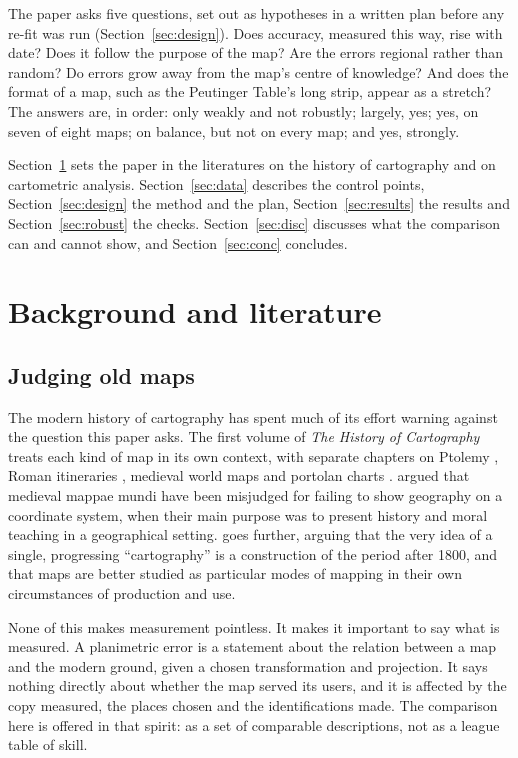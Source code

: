 \documentclass[11pt,a4paper]{article}
\begin{document}
The paper asks five questions, set out as hypotheses in a written plan before any re-fit was run (Section~\ref{sec:design}). Does accuracy, measured this way, rise with date? Does it follow the purpose of the map? Are the errors regional rather than random? Do errors grow away from the map's centre of knowledge? And does the format of a map, such as the Peutinger Table's long strip, appear as a stretch? The answers are, in order: only weakly and not robustly; largely, yes; yes, on seven of eight maps; on balance, but not on every map; and yes, strongly.

Section~\ref{sec:lit} sets the paper in the literatures on the history of cartography and on cartometric analysis. Section~\ref{sec:data} describes the control points, Section~\ref{sec:design} the method and the plan, Section~\ref{sec:results} the results and Section~\ref{sec:robust} the checks. Section~\ref{sec:disc} discusses what the comparison can and cannot show, and Section~\ref{sec:conc} concludes.

\section{Background and literature}\label{sec:lit}
\subsection{Judging old maps}
The modern history of cartography has spent much of its effort warning against the question this paper asks. The first volume of \textit{The History of Cartography} \citep{harley1987} treats each kind of map in its own context, with separate chapters on Ptolemy \citep{dilke1987a}, Roman itineraries \citep{dilke1987b}, medieval world maps \citep{woodward1987} and portolan charts \citep{campbell1987}. \citet{woodward1985} argued that medieval mappae mundi have been misjudged for failing to show geography on a coordinate system, when their main purpose was to present history and moral teaching in a geographical setting. \citet{edney2019} goes further, arguing that the very idea of a single, progressing ``cartography'' is a construction of the period after 1800, and that maps are better studied as particular modes of mapping in their own circumstances of production and use.

None of this makes measurement pointless. It makes it important to say what is measured. A planimetric error is a statement about the relation between a map and the modern ground, given a chosen transformation and projection. It says nothing directly about whether the map served its users, and it is affected by the copy measured, the places chosen and the identifications made. The comparison here is offered in that spirit: as a set of comparable descriptions, not as a league table of skill.
\end{document}
